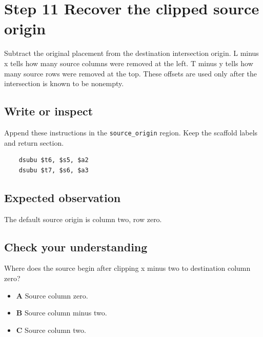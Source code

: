 \section{Step 11 Recover the clipped source origin}\label{blit-s11}

Subtract the original placement from the destination intersection origin. L minus x tells how many source columns were removed at the left. T minus y tells how many source rows were removed at the top. These offsets are used only after the intersection is known to be nonempty.

\subsection{Write or inspect}
Append these instructions in the \texttt{source\_origin} region. Keep the scaffold labels and return section.

\begin{verbatim}
    dsubu $t6, $s5, $a2
    dsubu $t7, $s6, $a3
\end{verbatim}

\subsection{Expected observation}
The default source origin is column two, row zero.

\subsection{Check your understanding}
Where does the source begin after clipping x minus two to destination column zero?

\begin{itemize}
  \item \textbf{A} Source column zero.
  \item \textbf{B} Source column minus two.
  \item \textbf{C} Source column two.
\end{itemize}
